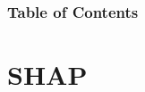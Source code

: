 \documentclass[aspectratio=169,handout]{beamer} %
\begin{document}
\frame{\titlepage}
\begin{frame}
\frametitle{Table of Contents}
\tableofcontents
\end{frame}



% 


\section{SHAP}
\end{document}
